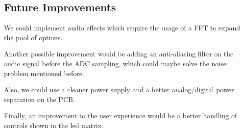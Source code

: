 \subsection{Future Improvements}

We could implement audio effects which require the usage of a FFT to expand the pool of options.\par
Another possible improvement would be adding an anti-aliasing filter on the audio signal before the ADC sampling, which could maybe solve the noise problem mentioned before.\par
Also, we could use a cleaner power supply and a better analog/digital power separation on the PCB.\par
Finally, an improvement to the user experience would be a better handling of controls shown in the led matrix.


